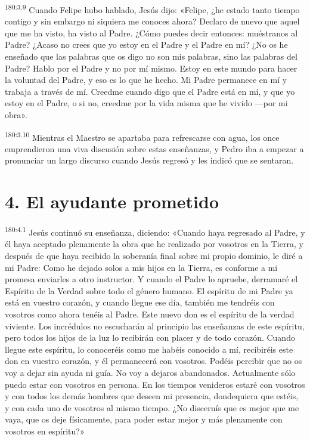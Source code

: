\par 
\textsuperscript{180:3.9} Cuando Felipe hubo hablado, Jesús dijo: «Felipe, ¿he estado tanto tiempo contigo y sin embargo ni siquiera me conoces ahora? Declaro de nuevo que aquel que me ha visto, ha visto al Padre. ¿Cómo puedes decir entonces: muéstranos al Padre? ¿Acaso no crees que yo estoy en el Padre y el Padre en mí? ¿No os he enseñado que las palabras que os digo no son mis palabras, sino las palabras del Padre? Hablo por el Padre y no por mí mismo. Estoy en este mundo para hacer la voluntad del Padre, y eso es lo que he hecho. Mi Padre permanece en mí y trabaja a través de mí. Creedme cuando digo que el Padre está en mí, y que yo estoy en el Padre, o si no, creedme por la vida misma que he vivido ---por mi obra».

\par 
\textsuperscript{180:3.10} Mientras el Maestro se apartaba para refrescarse con agua, los once emprendieron una viva discusión sobre estas enseñanzas, y Pedro iba a empezar a pronunciar un largo discurso cuando Jesús regresó y les indicó que se sentaran.

\section*{4. El ayudante prometido}
\par 
\textsuperscript{180:4.1} Jesús continuó su enseñanza, diciendo: «Cuando haya regresado al Padre, y él haya aceptado plenamente la obra que he realizado por vosotros en la Tierra, y después de que haya recibido la soberanía final sobre mi propio dominio, le diré a mi Padre: Como he dejado solos a mis hijos en la Tierra, es conforme a mi promesa enviarles a otro instructor. Y cuando el Padre lo apruebe, derramaré el Espíritu de la Verdad sobre todo el género humano. El espíritu de mi Padre ya está en vuestro corazón, y cuando llegue ese día, también me tendréis con vosotros como ahora tenéis al Padre. Este nuevo don es el espíritu de la verdad viviente. Los incrédulos no escucharán al principio las enseñanzas de este espíritu, pero todos los hijos de la luz lo recibirán con placer y de todo corazón. Cuando llegue este espíritu, lo conoceréis como me habéis conocido a mí, recibiréis este don en vuestro corazón, y él permanecerá con vosotros. Podéis percibir que no os voy a dejar sin ayuda ni guía. No voy a dejaros abandonados. Actualmente sólo puedo estar con vosotros en persona. En los tiempos venideros estaré con vosotros y con todos los demás hombres que deseen mi presencia, dondequiera que estéis, y con cada uno de vosotros al mismo tiempo. ¿No discernís que es mejor que me vaya, que os deje físicamente, para poder estar mejor y más plenamente con vosotros en espíritu?»


